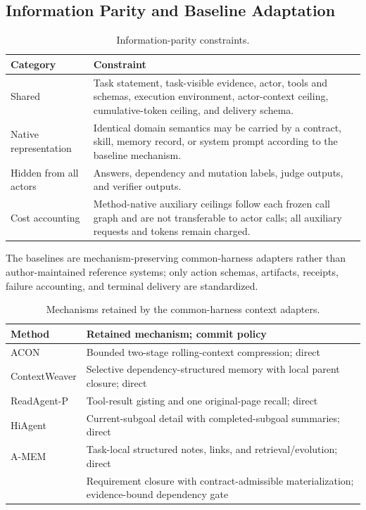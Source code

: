 \subsection{Information Parity and Baseline Adaptation}
\begin{table}[H]
\centering
\normalsize
\renewcommand{\arraystretch}{1.14}
\caption{Information-parity constraints.}
\begin{tabularx}{0.94\textwidth}{@{}p{} X@{}}
\toprule
\textbf{Category} & \textbf{Constraint} \\
\midrule
Shared & Task statement, task-visible evidence, actor, tools and schemas, execution environment, actor-context ceiling, cumulative-token ceiling, and delivery schema. \\
Native representation & Identical domain semantics may be carried by a contract, skill, memory record, or system prompt according to the baseline mechanism. \\
Hidden from all actors & Answers, dependency and mutation labels, judge outputs, and verifier outputs. \\
Cost accounting & Method-native auxiliary ceilings follow each frozen call graph and are not transferable to actor calls; all auxiliary requests and tokens remain charged. \\
\bottomrule
\end{tabularx}
\end{table}
The baselines are mechanism-preserving common-harness adapters rather than author-maintained reference systems; only action schemas, artifacts, receipts, failure accounting, and terminal delivery are standardized.
\begin{table}[H]
\centering
\normalsize
\renewcommand{\arraystretch}{1.14}
\setlength{\tabcolsep}{5pt}
\caption{Mechanisms retained by the common-harness context adapters.}
\label{tab:appendix-adapters}
\begin{tabularx}{0.94\textwidth}{@{}l X@{}}
\toprule
\textbf{Method} & \textbf{Retained mechanism; commit policy} \\
\midrule
ACON & Bounded two-stage rolling-context compression; direct \\
ContextWeaver & Selective dependency-structured memory with local parent closure; direct \\
ReadAgent-P & Tool-result gisting and one original-page recall; direct \\
HiAgent & Current-subgoal detail with completed-subgoal summaries; direct \\
A-MEM & Task-local structured notes, links, and retrieval/evolution; direct \\
\method{} & Requirement closure with contract-admissible materialization; evidence-bound dependency gate \\
\bottomrule
\end{tabularx}
\end{table}
